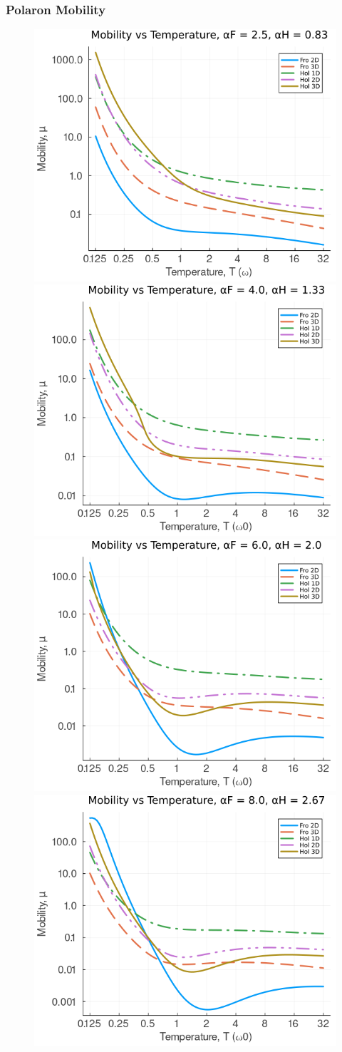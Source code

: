 \subsubsection{Polaron Mobility}

\begin{figure}[!tbp]
    \includegraphics[width=.49\textwidth]{figures/mobility_temp_25_083.png}
    \includegraphics[width=.49\textwidth]{figures/mobility_temp_4_133.png}
    \includegraphics[width=.49\textwidth]{figures/mobility_temp_6_2.png}
    \includegraphics[width=.49\textwidth]{figures/mobility_temp_8_267.png}

\end{figure}
